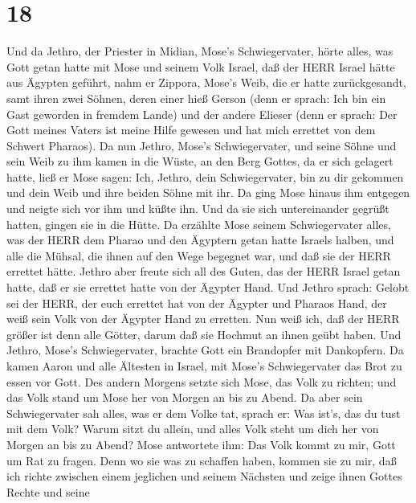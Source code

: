 \hypertarget{section-17}{%
\section{18}\label{section-17}}

 Und da Jethro, der Priester in Midian, Mose's
Schwiegervater, hörte alles, was Gott getan hatte mit Mose und seinem
Volk Israel, daß der HERR Israel hätte aus Ägypten geführt, 
nahm er Zippora, Mose's Weib, die er hatte zurückgesandt, 
samt ihren zwei Söhnen, deren einer hieß Gerson (denn er sprach: Ich bin
ein Gast geworden in fremdem Lande)  und der andere Elieser
(denn er sprach: Der Gott meines Vaters ist meine Hilfe gewesen und hat
mich errettet von dem Schwert Pharaos).  Da nun Jethro,
Mose's Schwiegervater, und seine Söhne und sein Weib zu ihm kamen in die
Wüste, an den Berg Gottes, da er sich gelagert hatte,  ließ
er Mose sagen: Ich, Jethro, dein Schwiegervater, bin zu dir gekommen und
dein Weib und ihre beiden Söhne mit ihr.  Da ging Mose
hinaus ihm entgegen und neigte sich vor ihm und küßte ihn. Und da sie
sich untereinander gegrüßt hatten, gingen sie in die Hütte. 
Da erzählte Mose seinem Schwiegervater alles, was der HERR dem Pharao
und den Ägyptern getan hatte Israels halben, und alle die Mühsal, die
ihnen auf den Wege begegnet war, und daß sie der HERR errettet hätte.
 Jethro aber freute sich all des Guten, das der HERR Israel
getan hatte, daß er sie errettet hatte von der Ägypter Hand.
 Und Jethro sprach: Gelobt sei der HERR, der euch errettet
hat von der Ägypter und Pharaos Hand, der weiß sein Volk von der Ägypter
Hand zu erretten.  Nun weiß ich, daß der HERR größer ist
denn alle Götter, darum daß sie Hochmut an ihnen geübt haben.
 Und Jethro, Mose's Schwiegervater, brachte Gott ein
Brandopfer mit Dankopfern. Da kamen Aaron und alle Ältesten in Israel,
mit Mose's Schwiegervater das Brot zu essen vor Gott.  Des
andern Morgens setzte sich Mose, das Volk zu richten; und das Volk stand
um Mose her von Morgen an bis zu Abend.  Da aber sein
Schwiegervater sah alles, was er dem Volke tat, sprach er: Was ist's,
das du tust mit dem Volk? Warum sitzt du allein, und alles Volk steht um
dich her von Morgen an bis zu Abend?  Mose antwortete ihm:
Das Volk kommt zu mir, Gott um Rat zu fragen.  Denn wo sie
was zu schaffen haben, kommen sie zu mir, daß ich richte zwischen einem
jeglichen und seinem Nächsten und zeige ihnen Gottes Rechte und seine
